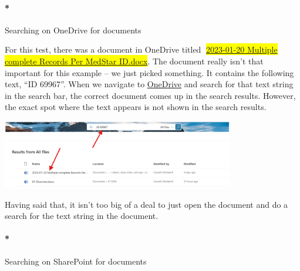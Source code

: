 \documentclass[
  letterpaper,
  DIV=11,
  numbers=noendperiod]{scrreprt}
\let\oldparagraph\paragraph
\renewcommand{\paragraph}[1]{\oldparagraph{#1}\mbox{}}
\begin{document}
\paragraph*{Searching on OneDrive for
documents}\label{searching-on-onedrive-for-documents}

For this test, there was a document in OneDrive titled
🔴\hl{\href{https://uthtmc-my.sharepoint.com/:w:/r/personal/michael_b_cannell_uth_tmc_edu/Documents/02\%20Research/04\%20DETECT/DETECT\%20NIA\%20R01/03\%20Repositories/detect_clean_mdac_call_logs/issues/2023-01-20\%20Multiple\%20complete\%20Records\%20Per\%20MedStar\%20ID.docx?d=w3e7bc77253eb4f8c8c466eadd8294c59&csf=1&web=1&e=THIPrF}{2023-01-20
Multiple complete Records Per MedStar ID.docx}}. The document really
isn't that important for this example -- we just picked something. It
contains the following text, ``ID 69967''. When we navigate to
\href{https://uthtmc-my.sharepoint.com/personal/michael_b_cannell_uth_tmc_edu/_layouts/15/onedrive.aspx?login_hint=Michael\%2EB\%2ECannell\%40uth\%2Etmc\%2Eedu}{OneDrive}
and search for that text string in the search bar, the correct document
comes up in the search results. However, the exact spot where the text
appears is not shown in the search results.

\begin{center}
\includegraphics[width=3.99in,height=\textheight]{chapters/authoring_sops/../../graphics/one_drive.png}
\end{center}

Having said that, it isn't too big of a deal to just open the document
and do a search for the text string in the document.

\paragraph*{Searching on SharePoint for
documents}\label{searching-on-sharepoint-for-documents}
\end{document}
